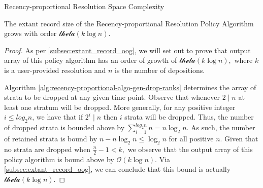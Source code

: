 \begin{theorem}{Recency-proportional Resolution Space Complexity}
\label{thm:recency-proportional-resolution-algo-space-complexity}

The \gls{extant record size} of the Recency-proportional Resolution Policy Algorithm grows with order $\mathcal{theta}{(k \log{n})}.$

\end{theorem}

\begin{proof}
\label{prf:recency-proportional-resolution-algo-space-complexity}
As per \ref{subsec:extant_record_oog}, we will set out to prove that output array of this policy algorithm has an order of growth of $\mathcal{theta}{(k \log{n})},$ where $k$ is a user-provided resolution and $n$ is the number of depositions.

Algorithm \ref{alg:recency-proportional-algo-gen-drop-ranks} determines the array of strata to be dropped at any given time point.
Observe that whenever $2 \mid n$ at least one stratum will be dropped.
More generally, for any positive integer $i \le log_2{n}$, we have that if $2^i \mid n$ then $i$ strata will be dropped. 
Thus, the number of dropped strata is bounded above by $\sum_{i=1}^{log_2{n}} n = n \log_2{n}.$
As such, the number of retained strata is bound by $n - n \log_2{n} \le \log_2{n}$ for all positive $n.$
Given that no strata are dropped when $\frac{n}{2} - 1 < k,$ we observe that the output array of this policy algorithm is bound above by $\mathcal{O}{(k \log{n})}.$
Via \ref{subsec:extant_record_oog}, we can conclude that this bound is actually $\mathcal{theta}{(k \log{n})}.$
\end{proof}
